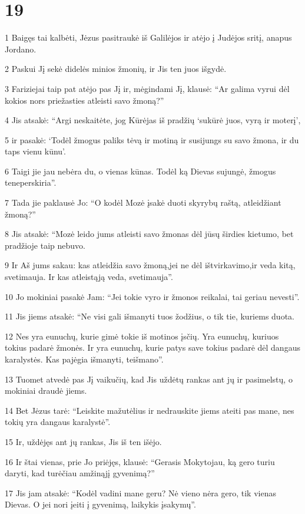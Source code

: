 \chapter{19}


\par 1 Baigęs tai kalbėti, Jėzus pasitraukė iš Galilėjos ir atėjo į Judėjos sritį, anapus Jordano. 
\par 2 Paskui Jį sekė didelės minios žmonių, ir Jis ten juos išgydė. 
\par 3 Fariziejai taip pat atėjo pas Jį ir, mėgindami Jį, klausė: “Ar galima vyrui dėl kokios nors priežasties atleisti savo žmoną?” 
\par 4 Jis atsakė: “Argi neskaitėte, jog Kūrėjas iš pradžių ‘sukūrė juos, vyrą ir moterį’, 
\par 5 ir pasakė: ‘Todėl žmogus paliks tėvą ir motiną ir susijungs su savo žmona, ir du taps vienu kūnu’. 
\par 6 Taigi jie jau nebėra du, o vienas kūnas. Todėl ką Dievas sujungė, žmogus teneperskiria”. 
\par 7 Tada jie paklausė Jo: “O kodėl Mozė įsakė duoti skyrybų raštą, atleidžiant žmoną?” 
\par 8 Jis atsakė: “Mozė leido jums atleisti savo žmonas dėl jūsų širdies kietumo, bet pradžioje taip nebuvo. 
\par 9 Ir Aš jums sakau: kas atleidžia savo žmoną,­jei ne dėl ištvirkavimo,­ir veda kitą, svetimauja. Ir kas atleistąją veda, svetimauja”. 
\par 10 Jo mokiniai pasakė Jam: “Jei tokie vyro ir žmonos reikalai, tai geriau nevesti”. 
\par 11 Jis jiems atsakė: “Ne visi gali išmanyti tuos žodžius, o tik tie, kuriems duota. 
\par 12 Nes yra eunuchų, kurie gimė tokie iš motinos įsčių. Yra eunuchų, kuriuos tokius padarė žmonės. Ir yra eunuchų, kurie patys save tokius padarė dėl dangaus karalystės. Kas pajėgia išmanyti, teišmano”. 
\par 13 Tuomet atvedė pas Jį vaikučių, kad Jis uždėtų rankas ant jų ir pasimelstų, o mokiniai draudė jiems. 
\par 14 Bet Jėzus tarė: “Leiskite mažutėlius ir nedrauskite jiems ateiti pas mane, nes tokių yra dangaus karalystė”. 
\par 15 Ir, uždėjęs ant jų rankas, Jis iš ten išėjo. 
\par 16 Ir štai vienas, prie Jo priėjęs, klausė: “Gerasis Mokytojau, ką gero turiu daryti, kad turėčiau amžinąjį gyvenimą?” 
\par 17 Jis jam atsakė: “Kodėl vadini mane geru? Nė vieno nėra gero, tik vienas Dievas. O jei nori įeiti į gyvenimą, laikykis įsakymų”. 
